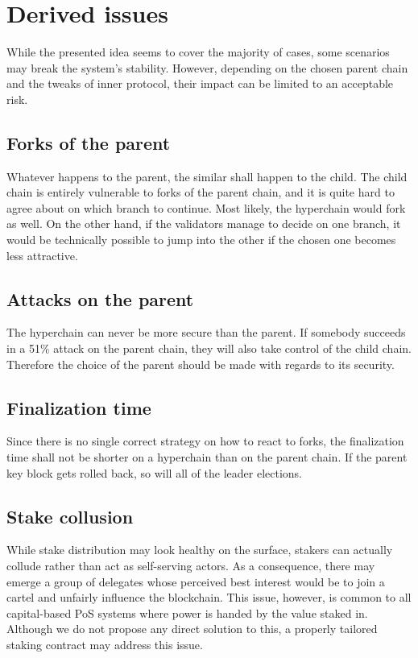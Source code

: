 \section{Derived issues}

While the presented idea seems to cover the majority of cases, some scenarios
may break the system's stability. However, depending on the chosen parent chain
and the tweaks of inner protocol, their impact can be limited to an acceptable
risk.

\subsection{Forks of the parent}

Whatever happens to the parent, the similar shall happen to the child. The child
chain is entirely vulnerable to forks of the parent chain, and it is quite hard
to agree about on which branch to continue. Most likely, the hyperchain would
fork as well. On the other hand, if the validators manage to decide on one
branch, it would be technically possible to jump into the other if the chosen
one becomes less attractive.

\subsection{Attacks on the parent}

The hyperchain can never be more secure than the parent. If somebody succeeds in
a 51\% attack on the parent chain, they will also take control of the child
chain. Therefore the choice of the parent should be made with regards to its
security.

\subsection{Finalization time}

Since there is no single correct strategy on how to react to forks, the
finalization time shall not be shorter on a hyperchain than on the parent chain.
If the parent key block gets rolled back, so will all of the leader elections.

\subsection{Stake collusion}

While stake distribution may look healthy on the surface, stakers can actually
collude rather than act as self-serving actors. As a consequence, there may
emerge a group of delegates whose perceived best interest would be to join a
cartel and unfairly influence the blockchain. This issue, however, is common to
all capital-based PoS systems where power is handed by the value staked in.
Although we do not propose any direct solution to this, a properly tailored
staking contract may address this issue.
